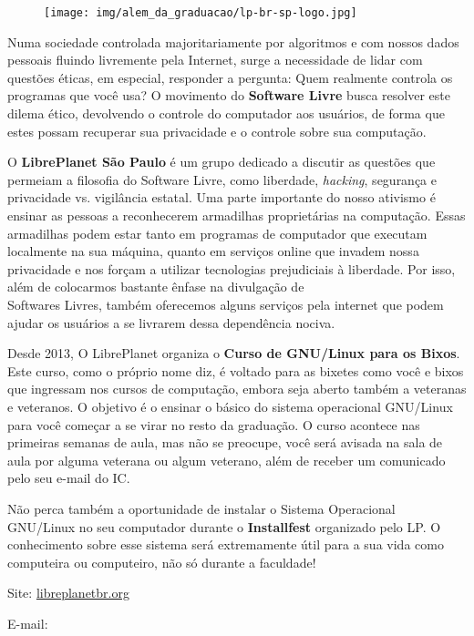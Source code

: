 \begin{figure}[h!]
  \centering
  \texttt{[image: img/alem\_da\_graduacao/lp-br-sp-logo.jpg]}
\end{figure}

Numa sociedade controlada majoritariamente por algoritmos e com nossos dados
pessoais fluindo livremente pela Internet, surge a necessidade de lidar com
questões éticas, em especial, responder a pergunta: Quem realmente controla os
programas que você usa?  O movimento do \textbf{Software Livre} busca resolver
este dilema ético, devolvendo o controle do computador aos usuários, de forma
que estes possam recuperar sua privacidade e o controle sobre sua computação.

O \textbf{LibrePlanet São Paulo} é um grupo dedicado a discutir as questões que
permeiam a filosofia do Software Livre, como liberdade, \emph{hacking},
segurança e privacidade vs. vigilância estatal. Uma parte importante do nosso
ativismo é ensinar as pessoas a reconhecerem armadilhas proprietárias na
computação. Essas armadilhas podem estar tanto em programas de computador que
executam localmente na sua máquina, quanto em serviços online que invadem nossa
privacidade e nos forçam a utilizar tecnologias prejudiciais à liberdade. Por
isso, além de colocarmos bastante ênfase na divulgação de\\Softwares Livres,
também oferecemos alguns serviços pela internet que podem ajudar os usuários a
se livrarem dessa dependência nociva.

Desde 2013, O LibrePlanet organiza o \textbf{Curso de GNU/Linux para os Bixos}.
Este curso, como o próprio nome diz, é voltado para as bixetes como você e
bixos que ingressam nos cursos de computação, embora seja aberto também a
veteranas e veteranos. O objetivo é o ensinar o básico do sistema operacional
GNU/Linux para você começar a se virar no resto da graduação. O curso acontece
nas primeiras semanas de aula, mas não se preocupe, você será avisada na sala
de aula por alguma veterana ou algum veterano, além de receber um comunicado
pelo seu e-mail do IC.

Não perca também a oportunidade de instalar o Sistema Operacional GNU/Linux no
seu computador durante o \textbf{Installfest} organizado pelo LP. O
conhecimento sobre esse sistema será extremamente útil para a sua vida como
computeira ou computeiro, não só durante a faculdade!

\begin{compactitemize}
\item Site: \url{libreplanetbr.org}
\item E-mail: 
\end{compactitemize}


